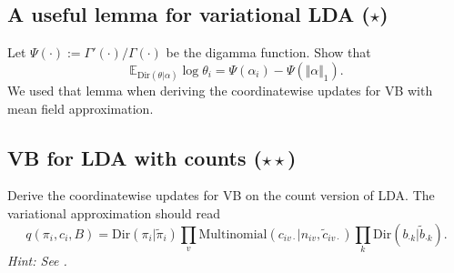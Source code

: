 \documentclass{article}
\begin{document}
\subsection{A useful lemma for variational LDA ($\star$)}
Let $\Psi(\cdot) := \Gamma'(\cdot)/\Gamma(\cdot)$ be the digamma function. Show that
$$
\mathbb{E}_{\text{Dir}(\theta\vert\alpha)} \log \theta_i = \Psi(\alpha_i) - \Psi(\Vert \alpha\Vert_1).
$$
We used that lemma when deriving the coordinatewise updates for VB with mean field approximation.


\subsection{VB for LDA with counts ($\star\star$)}
Derive the coordinatewise updates for VB on the count version of LDA. The variational approximation should read
$$
q(\pi_i, c_i, B) = \text{Dir}(\pi_i\vert\tilde\pi_i) \prod_v \text{Multinomial}(c_{iv\cdot}\vert n_{iv}, \tilde{c}_{iv\cdot}) \prod_k \text{Dir}(b_{\cdot k}\vert\tilde b_{\cdot k}).
$$
\emph{Hint: See \cite[Section 27.3.6]{Mur12}.}



\end{document}
